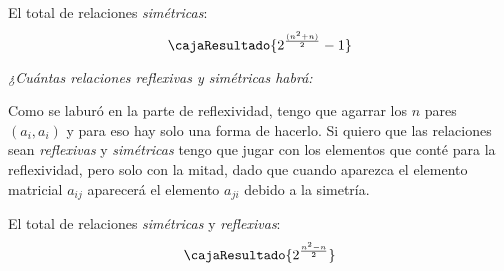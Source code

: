 El total de relaciones \textit{simétricas}:
$$
  \cajaResultado{
    2^{\frac{(n^2 + n)}{2}} - 1
  }
$$

\vspace{1cm}

\textit{¿Cuántas relaciones reflexivas y simétricas habrá:}

Como se laburó en la parte de reflexividad, tengo que agarrar los $n$ pares $(a_i,a_i)$ y para eso hay solo una forma de hacerlo.
Si quiero que las relaciones sean \textit{reflexivas} y \textit{simétricas} tengo que jugar con los elementos que conté para la
reflexividad, pero solo con la mitad, dado que cuando aparezca el elemento matricial $a_{ij}$ aparecerá el elemento $a_{ji}$
debido a la simetría.

El total de relaciones \textit{simétricas} y \textit{reflexivas}:
$$
  \cajaResultado{
    2^{\frac{n^2 - n}{2}}
  }
$$

\begin{aportes}
  \item {}
\end{aportes}

